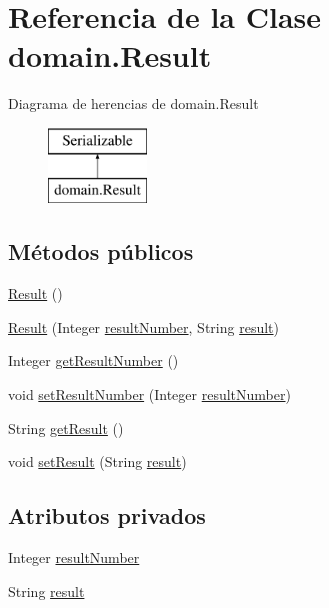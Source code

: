 \hypertarget{classdomain_1_1Result}{}\section{Referencia de la Clase domain.\+Result}
\label{classdomain_1_1Result}
Diagrama de herencias de domain.\+Result\begin{figure}[H]
\begin{center}
\leavevmode
\includegraphics[height=2.000000cm]{classdomain_1_1Result}
\end{center}
\end{figure}
\subsection*{Métodos públicos}
\begin{DoxyCompactItemize}
\item 
\mbox{\hyperlink{classdomain_1_1Result_a0ad4f30f5b6195abe95e2a491ee067e9}{Result}} ()
\item 
\mbox{\hyperlink{classdomain_1_1Result_a8f778bfb79029a4cb7930fb9f1f642fd}{Result}} (Integer \mbox{\hyperlink{classdomain_1_1Result_a395f320b24359857058e76236dd310a1}{result\+Number}}, String \mbox{\hyperlink{classdomain_1_1Result_aaa1c1c6538516795610d5a23a200d2e1}{result}})
\item 
Integer \mbox{\hyperlink{classdomain_1_1Result_af58156faca0e4356691cab2b8c7159f5}{get\+Result\+Number}} ()
\item 
void \mbox{\hyperlink{classdomain_1_1Result_aa74643d5a07d5d5af733e1b5584eca03}{set\+Result\+Number}} (Integer \mbox{\hyperlink{classdomain_1_1Result_a395f320b24359857058e76236dd310a1}{result\+Number}})
\item 
String \mbox{\hyperlink{classdomain_1_1Result_a2feef61d204f908dec8bd04f10b9a89b}{get\+Result}} ()
\item 
void \mbox{\hyperlink{classdomain_1_1Result_a5648afcb541d207b61a7202609a41a27}{set\+Result}} (String \mbox{\hyperlink{classdomain_1_1Result_aaa1c1c6538516795610d5a23a200d2e1}{result}})
\end{DoxyCompactItemize}
\subsection*{Atributos privados}
\begin{DoxyCompactItemize}
\item 
Integer \mbox{\hyperlink{classdomain_1_1Result_a395f320b24359857058e76236dd310a1}{result\+Number}}
\item 
String \mbox{\hyperlink{classdomain_1_1Result_aaa1c1c6538516795610d5a23a200d2e1}{result}}
\end{DoxyCompactItemize}


